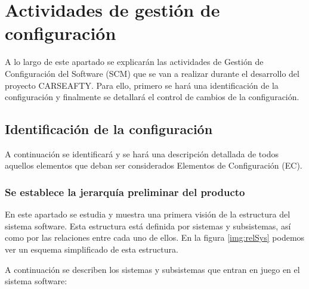 \section{Actividades de gestión de configuración}
\par A lo largo de este apartado se explicarán las actividades de Gestión de Configuración del Software (SCM) que se van a realizar durante el desarrollo del proyecto CARSEAFTY. Para ello, primero se hará una identificación de la configuración y finalmente se detallará el control de cambios de la configuración.

\subsection{Identificación de la configuración}
\par A continuación se identificará y se hará una descripción detallada de todos aquellos elementos que deban ser considerados Elementos de Configuración (EC).
\subsubsection{Se establece la jerarquía preliminar del producto}
\par En este apartado se estudia y muestra una primera visión de la estructura del sistema software. Esta estructura está definida por sistemas y subsistemas, así como por las relaciones entre cada uno de ellos. En la figura \ref{img:relSys} podemos ver un esquema simplificado de esta estructura.
\par A continuación se describen los sistemas y subsistemas que entran en juego en el sistema software:

